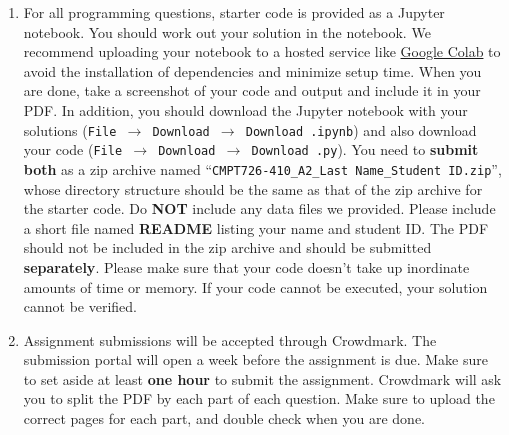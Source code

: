 \documentclass[10pt]{article}
\begin{document}
\begin{enumerate}
    \item For all programming questions, starter code is provided as a Jupyter notebook. You should work out your solution in the notebook. We recommend uploading your notebook to a hosted service like \href{https://colab.research.google.com/}{Google Colab} to avoid the installation of dependencies and minimize setup time. When you are done, take a screenshot of your code and output and include it in your PDF. In addition, you should download the Jupyter notebook with your solutions (\texttt{File $\rightarrow$ Download $\rightarrow$ Download .ipynb}) and also download your code (\texttt{File $\rightarrow$ Download $\rightarrow$ Download .py}). You need to \textbf{submit both} as a zip archive named ``\texttt{CMPT726-410\_A2\_\textlangle Last Name\textrangle\_\textlangle Student ID\textrangle.zip}'', whose directory structure should be the same as that of the zip archive for the starter code. Do \textbf{NOT} include any data files we provided. Please include a short file named \textbf{README} listing your name and student ID. The PDF should not be included in the zip archive and should be submitted \textbf{separately}. Please make sure that your code doesn't take up inordinate amounts of time or memory. If your code cannot be executed, your solution cannot be verified. 
    
    \item Assignment submissions will be accepted through Crowdmark. The submission portal will open a week before the assignment is due. Make sure to set aside at least \textbf{one hour} to submit the assignment. Crowdmark will ask you to split the PDF by each part of each question. Make sure to upload the correct pages for each part, and double check when you are done. 
\end{enumerate}
\end{document}
